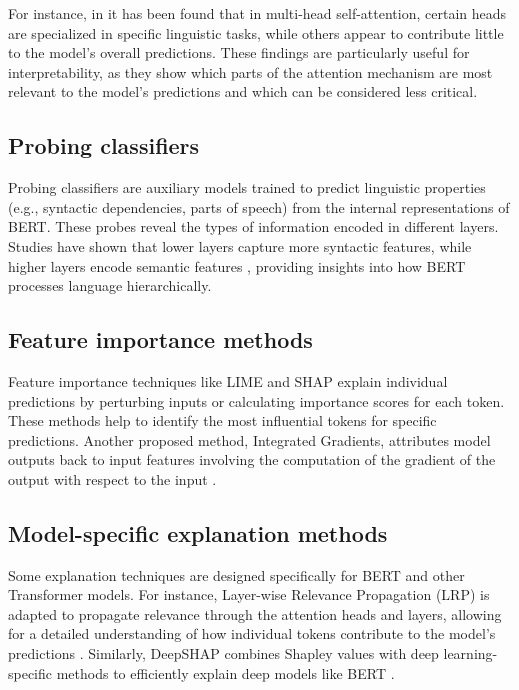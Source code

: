 For instance, in \cite{voita2019} it has been found that in multi-head self-attention, certain heads are specialized in specific linguistic tasks, while others appear to contribute little to the model’s overall predictions. These findings are particularly useful for interpretability, as they show which parts of the attention mechanism are most relevant to the model’s predictions and which can be considered less critical.

\subsection{Probing classifiers}
Probing classifiers are auxiliary models trained to predict linguistic properties (e.g., syntactic dependencies, parts of speech) from the internal representations of BERT. These probes reveal the types of information encoded in different layers. Studies have shown that lower layers capture more syntactic features, while higher layers encode semantic features \cite{tenney2019}, providing insights into how BERT processes language hierarchically.

\subsection{Feature importance methods}
Feature importance techniques like LIME \cite{ribeiro2016} and SHAP \cite{lundberg2017} explain individual predictions by perturbing inputs or calculating importance scores for each token. These methods help to identify the most influential tokens for specific predictions. Another proposed method, Integrated Gradients, attributes model outputs back to input features involving the computation of the gradient of the output with respect to the input \cite{sundararajan2017}.

\subsection{Model-specific explanation methods}
Some explanation techniques are designed specifically for BERT and other Transformer models. For instance, Layer-wise Relevance Propagation (LRP) is adapted to propagate relevance through the attention heads and layers, allowing for a detailed understanding of how individual tokens contribute to the model's predictions \cite{voita2019}. Similarly, DeepSHAP combines Shapley values with deep learning-specific methods to efficiently explain deep models like BERT \cite{lundberg2017}.

